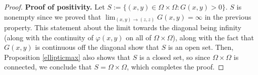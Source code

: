 \documentclass[12pt]{article}
\theoremstyle{plain}
\begin{document}
\begin{proof}
\medskip

\noindent \textbf{Proof of positivity.} Let $S := \{(x, y) \in \Omega \times \Omega : G(x, y) > 0\}$. $S$ is nonempty since we proved that $\lim_{(x, y) \to (z, z)} G(x, y) = \infty$ in the previous property. This statement about the limit towards the diagonal being infinity (along with the continuity of $\varphi(x, y)$ on all of $\Omega \times \Omega$), along with the fact that $G(x, y)$ is continuous off the diagonal show that $S$ is an open set. Then, Proposition \ref{ellipticmax} also shows that $S$ is a closed set, so since $\Omega \times \Omega$ is connected, we conclude that $S = \Omega \times \Omega$, which completes the proof. 

\end{proof}


\printbibliography
\end{document}
